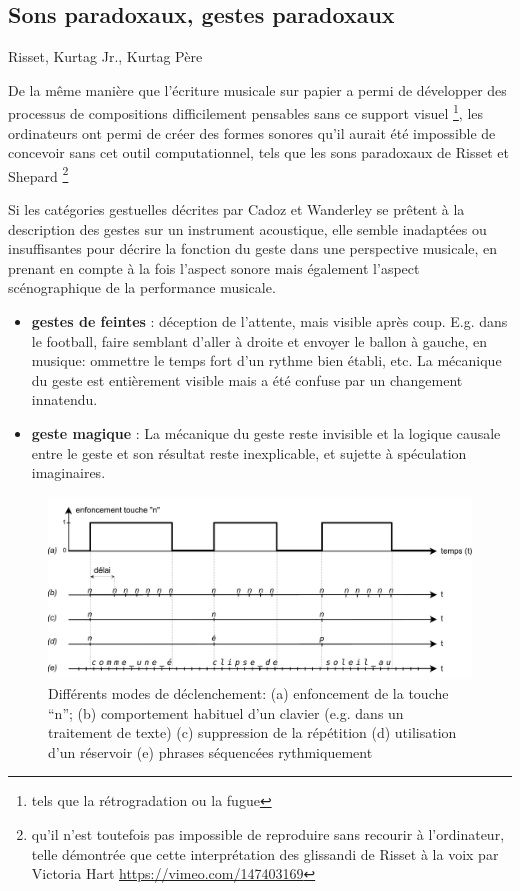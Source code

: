 \subsection{Sons paradoxaux, gestes paradoxaux}
Risset, Kurtag Jr., Kurtag Père

De la même manière que l'écriture musicale sur papier a permi de développer des processus de compositions difficilement pensables sans ce support visuel \footnote{tels que la rétrogradation ou la fugue}, les ordinateurs ont permi de créer des formes sonores qu'il aurait été impossible de concevoir sans cet outil computationnel, tels que les sons paradoxaux de Risset et Shepard \footnote{qu'il n'est toutefois pas impossible de reproduire sans recourir à l'ordinateur, telle démontrée que cette interprétation des glissandi de Risset à la voix par Victoria Hart \url{https://vimeo.com/147403169}}

Si les catégories gestuelles décrites par Cadoz et Wanderley se prêtent à la description des gestes sur un instrument acoustique, elle semble inadaptées ou insuffisantes pour décrire la fonction du geste dans une perspective musicale, en prenant en compte à la fois l'aspect sonore mais également l'aspect scénographique de la performance musicale.

\vspace{-1em}
\begin{itemize}[noitemsep]
\item \textbf{gestes de feintes} : déception de l'attente, mais visible après coup. E.g. dans le football, faire semblant d'aller à droite et envoyer le ballon à gauche, en musique: ommettre le temps fort d'un rythme bien établi, etc. La mécanique du geste est entièrement visible mais a été confuse par un changement innatendu.
\item \textbf{geste magique} : La mécanique du geste reste invisible et la logique causale entre le geste et son résultat reste inexplicable, et sujette à spéculation imaginaires.
\end{itemize}


\begin{figure}[!htbp]
	\includegraphics[width=\textwidth]{gfx/03_gesture/key_modes.pdf}
	\caption{Différents modes de déclenchement: (a) enfoncement de la touche ``n''; (b) comportement habituel d'un clavier (e.g. dans un traitement de texte) (c) suppression de la répétition (d) utilisation d'un réservoir (e) phrases séquencées rythmiquement}
	\label{fig:gesture:triggering_modes}
\end{figure}


